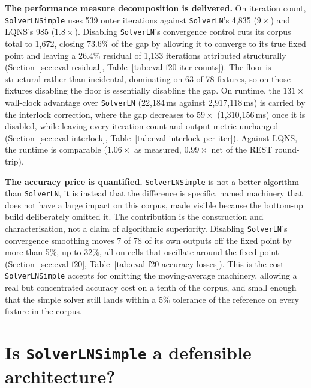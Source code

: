 \textbf{The performance measure decomposition is delivered.} On iteration count, \texttt{SolverLNSimple} uses 539 outer iterations against \texttt{SolverLN}'s 4,835 ($9\times$) and LQNS's 985 ($1.8\times$). Disabling \texttt{SolverLN}'s convergence control cuts its corpus total to 1,672, closing $73.6\%$ of the gap by allowing it to converge to its true fixed point and leaving a $26.4\%$ residual of 1,133 iterations attributed structurally (Section~\ref{sec:eval-residual}, Table~\ref{tab:eval-f20-iter-counts}). The floor is structural rather than incidental, dominating on 63 of 78 fixtures, so on those fixtures disabling the floor is essentially disabling the gap. On runtime, the $131\times$ wall-clock advantage over \texttt{SolverLN} (22{,}184\,ms against 2{,}917{,}118\,ms) is carried by the interlock correction, where the gap decreases to $59\times$ (1{,}310{,}156\,ms) once it is disabled, while leaving every iteration count and output metric unchanged (Section~\ref{sec:eval-interlock}, Table~\ref{tab:eval-interlock-per-iter}). Against LQNS, the runtime is comparable ($1.06\times$ as measured, $0.99\times$ net of the REST round-trip).

\textbf{The accuracy price is quantified.} \texttt{SolverLNSimple} is not a better algorithm than \texttt{SolverLN}, it is instead that the difference is specific, named machinery that does not have a large impact on this corpus, made visible because the bottom-up build deliberately omitted it. The contribution is the construction and characterisation, not a claim of algorithmic superiority. Disabling \texttt{SolverLN}'s convergence smoothing moves 7 of 78 of its own outputs off the fixed point by more than 5\%, up to 32\%, all on cells that oscillate around the fixed point (Section~\ref{sec:eval-f20}, Table~\ref{tab:eval-f20-accuracy-losses}). This is the cost \texttt{SolverLNSimple} accepts for omitting the moving-average machinery, allowing a real but concentrated accuracy cost on a tenth of the corpus, and small enough that the simple solver still lands within a 5\% tolerance of the reference on every fixture in the corpus.


\section{Is \texttt{SolverLNSimple} a defensible architecture?}
\label{sec:concl-defensible}

